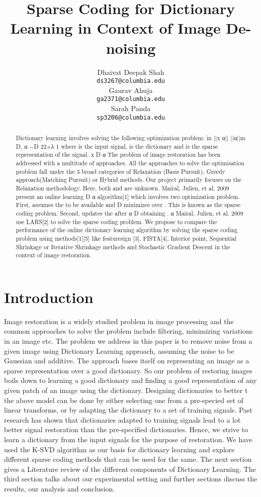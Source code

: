 \documentclass{article} %
\title{Sparse Coding for Dictionary Learning in Context of Image De-noising}
\author{
Dhaivat Deepak Shah\\
\texttt{ds3267@columbia.edu} \\
\And
Gaurav Ahuja\\
\texttt{ga2371@columbia.edu} \\
\And
Sarah Panda\\
\texttt{sp3206@columbia.edu} \\
}
\begin{document}
\maketitle


\begin{abstract}
Dictionary learning involves solving the following optimization problem: in 
||x α|| ||α||m D, α −D 22+λ 1 where  is the input signal,   is the dictionary and   is the sparse representation of the signal. 
x D α  
The problem of image restoration has been addressed with a multitude of approaches. All the approaches to solve the optimisation problem fall under the 3 broad categories of  Relaxation (Basis Pursuit), Greedy approach(Matching Pursuit) or Hybrid methods. Our project  primarily focuses on the Relaxation methodology.
Here, both   and   are unknown.  Mairal, Julien, et al, 2009 present an online learning D α   algorithm[1] which involves two optimization problem. First, assumes the   to be available and D   minimizes over . This is known as the sparse coding problem. Second, updates the   after α D   obtaining  . α  
Mairal, Julien, et al, 2009 use LARS[2]  to solve the sparse coding problem. We propose to  compare the performance of the online dictionary learning algorithm by solving the sparse coding  problem using methods[1][5] like feature­sign [3], FISTA[4], Interior point, Sequential Shrinkage or  Iterative Shrinkage methods and Stochastic Gradient Descent in the context of image  restoration.
\end{abstract}

\vspace{-.2cm}
\section{Introduction}
\vspace{-.2cm}
Image restoration is a widely studied problem in image processing and the common approaches to solve the problem include filtering, minimizing variations in an image etc. The problem we address in this paper is to remove noise from a given image using Dictionary Learning approach, assuming the noise to be Gaussian and additive. The approach bases itself on representing an image as a sparse representation over a good dictionary. So our problem of restoring images boils down to learning a good dictionary and finding a good representation of any given patch of an image using the dictionary. Designing dictionaries to better t the above model can be done by either selecting one from a pre-specied set of linear transforms, or by adapting the dictionary to a set of training signals. Past research has shown that dictionaries adapted to training signals lead to a lot better signal restoration than the pre-specified dictionaries. Hence, we strive to learn a dictionary from the input signals for the purpose of restoration. We have used the K-SVD algorithm as our basis for dictionary learning and explore different sparse coding methods that can be used for the same. The next section gives a Literature review of the different components of Dictionary Learning. The third section talks about our experimental setting and further sections discuss the results, our analysis and conclusion. 
\end{document}
